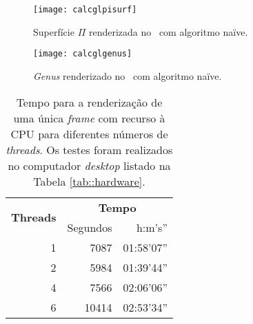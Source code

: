 \begin{figure}[!htbp]
	\centering
	\texttt{[image: calcglpisurf]}
	\caption[Superfície $\Pi$ no \theapp~com algoritmo naïve]{Superfície $\Pi$ renderizada no \theapp~com algoritmo naïve.}
	\label{fig::calcglpisurf}
\end{figure}

\begin{figure}[!htbp]
	\centering
	\texttt{[image: calcglgenus]}
	\caption[\textit{Genus} no \theapp~com algoritmo naïve]{\textit{Genus} renderizado no \theapp~com algoritmo naïve.}
	\label{fig::calcglgenus}
\end{figure}




\begin{table}[!htbp]
	\centering
	\caption[Tempos de renderização em \acs{CPU}]{Tempo para a renderização de uma única \textit{frame} com recurso à \acs{CPU} para diferentes números de \textit{threads}. Os testes foram realizados no computador \textit{desktop} listado na Tabela \ref{tab::hardware}.}
	\label{tab::render_cpu}
	\begin{tabular}{r r r}
		\toprule
		\multirow{2}{*}{\textbf{Threads}} & \multicolumn{2}{c}{\textbf{Tempo}} \\
		\cline{2-3}
		& Segundos & h:m's'' \\
		\midrule
		1 &  7087 & 01:58'07'' \\
		2 &  5984 & 01:39'44'' \\
		4 &  7566 & 02:06'06'' \\
		6 & 10414 & 02:53'34'' \\
		\bottomrule
	\end{tabular}
\end{table}


